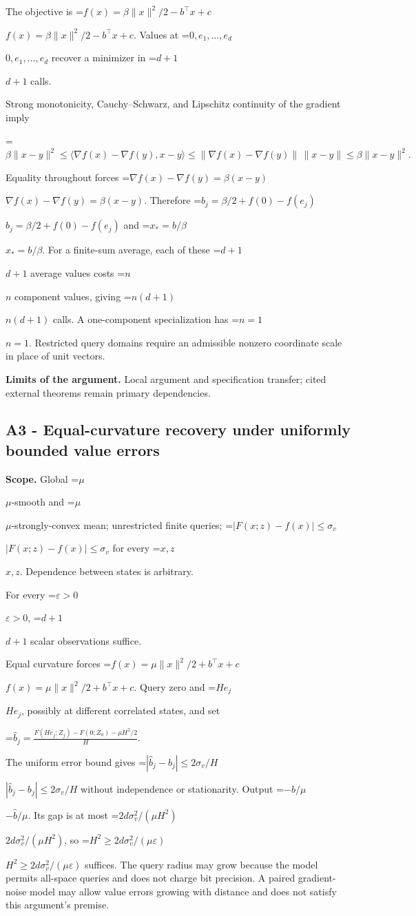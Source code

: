 \documentclass[10pt,a4paper]{article}
\newcommand{\AtlasMath}[1]{\par\begingroup\centering\setbox0=\hbox{$\displaystyle #1$}\ifdim\wd0>1.4\linewidth\typeout{ATLAS WIDE FORMULA: \the\wd0}\fi\ifdim\wd0>\linewidth\resizebox{\linewidth}{!}{\box0}\else\box0\fi\par\endgroup}
\newcommand{\AtlasInlineMath}[1]{\begingroup\setbox0=\hbox{$#1$}\ifdim\wd0>.4\linewidth\endgroup\AtlasMath{#1}\else\endgroup$#1$\fi}
\begin{document}
The objective is \AtlasInlineMath{f(x)=\beta\|x\|^2/2-b^\top x+c}. Values at \AtlasInlineMath{0,e_1,\ldots,e_d} recover a minimizer in \AtlasInlineMath{d+1} calls.

Strong monotonicity, Cauchy--Schwarz, and Lipschitz continuity of the gradient imply

\AtlasMath{\beta\|x-y\|^2\le\langle\nabla f(x)-\nabla f(y),x-y\rangle\le\|\nabla f(x)-\nabla f(y)\|\,\|x-y\|\le\beta\|x-y\|^2.}

Equality throughout forces \AtlasInlineMath{\nabla f(x)-\nabla f(y)=\beta(x-y)}. Therefore \AtlasInlineMath{b_j=\beta/2+f(0)-f(e_j)} and \AtlasInlineMath{x_*=b/\beta}. For a finite-sum average, each of these \AtlasInlineMath{d+1} average values costs \AtlasInlineMath{n} component values, giving \AtlasInlineMath{n(d+1)} calls. A one-component specialization has \AtlasInlineMath{n=1}. Restricted query domains require an admissible nonzero coordinate scale in place of unit vectors.

\textbf{Limits of the argument.} Local argument and specification transfer; cited external theorems remain primary dependencies.

\subsection{A3 - Equal-curvature recovery under uniformly bounded value errors}
\textbf{Scope.} Global \AtlasInlineMath{\mu}-smooth and \AtlasInlineMath{\mu}-strongly-convex mean; unrestricted finite queries; \AtlasInlineMath{|F(x;z)-f(x)|\le\sigma_v} for every \AtlasInlineMath{x,z}. Dependence between states is arbitrary.

For every \AtlasInlineMath{\varepsilon>0}, \AtlasInlineMath{d+1} scalar observations suffice.

Equal curvature forces \AtlasInlineMath{f(x)=\mu\|x\|^2/2+b^\top x+c}. Query zero and \AtlasInlineMath{He_j}, possibly at different correlated states, and set

\AtlasMath{\widehat b_j=\frac{F(He_j;Z_j)-F(0;Z_0)-\mu H^2/2}{H}.}

The uniform error bound gives \AtlasInlineMath{|\widehat b_j-b_j|\le2\sigma_v/H} without independence or stationarity. Output \AtlasInlineMath{-\widehat b/\mu}. Its gap is at most \AtlasInlineMath{2d\sigma_v^2/(\mu H^2)}, so \AtlasInlineMath{H^2\ge2d\sigma_v^2/(\mu\varepsilon)} suffices. The query radius may grow because the model permits all-space queries and does not charge bit precision. A paired gradient-noise model may allow value errors growing with distance and does not satisfy this argument's premise.
\end{document}
